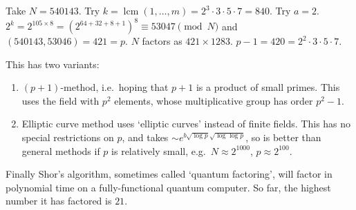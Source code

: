 \documentclass{article}
\begin{document}
\begin{eg}
    Take $N = 540143$. Try $k = \operatorname{lcm}(1,\dotsc,m) = 2^3 \cdot 3 \cdot 5 \cdot 7 = 840$.
    Try $a=2$. $2^k = 2^{105 \times 8} = (2^{64 + 32 + 8 + 1})^8 \equiv 53047 \pmod{N}$ and $(540143, 53046) = 421 = p$.
    $N$ factors as $421 \times 1283$. $p-1 = 420 = 2^2 \cdot 3 \cdot 5 \cdot 7$.
\end{eg}

This has two variants:
\begin{enumerate}[label=(\arabic*)]
    \item $(p+1)$-method, i.e.\ hoping that $p+1$ is a product of small primes.
        This uses the field with $p^2$ elements, whose multiplicative group has order $p^2 - 1$.
    \item Elliptic curve method uses `elliptic curves' instead of finite fields.
        This has no special restrictions on $p$, and takes $\sim e^{b \sqrt{\log p} \sqrt{\log \log p}}$, so is better than general methods if $p$ is relatively small, e.g.\ $N \approx 2^{1000}$, $p \approx 2^{100}$.
\end{enumerate}

Finally Shor's algorithm, sometimes called `quantum factoring', will factor in polynomial time on a fully-functional quantum computer.
So far, the highest number it has factored is $21$.
\end{document}
